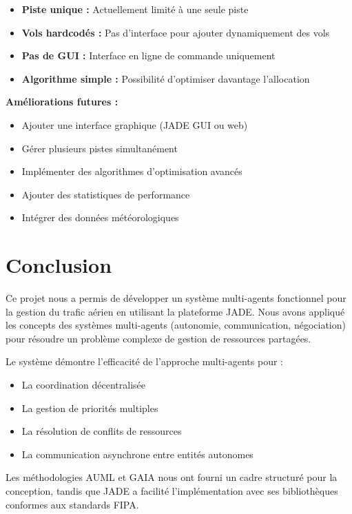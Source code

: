 \documentclass[12pt,a4paper]{article}
\begin{document}
\begin{itemize}
    \item \textbf{Piste unique :} Actuellement limité à une seule piste
    \item \textbf{Vols hardcodés :} Pas d'interface pour ajouter dynamiquement des vols
    \item \textbf{Pas de GUI :} Interface en ligne de commande uniquement
    \item \textbf{Algorithme simple :} Possibilité d'optimiser davantage l'allocation
\end{itemize}

\textbf{Améliorations futures :}
\begin{itemize}
    \item Ajouter une interface graphique (JADE GUI ou web)
    \item Gérer plusieurs pistes simultanément
    \item Implémenter des algorithmes d'optimisation avancés
    \item Ajouter des statistiques de performance
    \item Intégrer des données météorologiques
\end{itemize}

\section{Conclusion}

Ce projet nous a permis de développer un système multi-agents fonctionnel pour la gestion du trafic aérien en utilisant la plateforme JADE. Nous avons appliqué les concepts des systèmes multi-agents (autonomie, communication, négociation) pour résoudre un problème complexe de gestion de ressources partagées.

Le système démontre l'efficacité de l'approche multi-agents pour :
\begin{itemize}
    \item La coordination décentralisée
    \item La gestion de priorités multiples
    \item La résolution de conflits de ressources
    \item La communication asynchrone entre entités autonomes
\end{itemize}

Les méthodologies AUML et GAIA nous ont fourni un cadre structuré pour la conception, tandis que JADE a facilité l'implémentation avec ses bibliothèques conformes aux standards FIPA.
\end{document}
